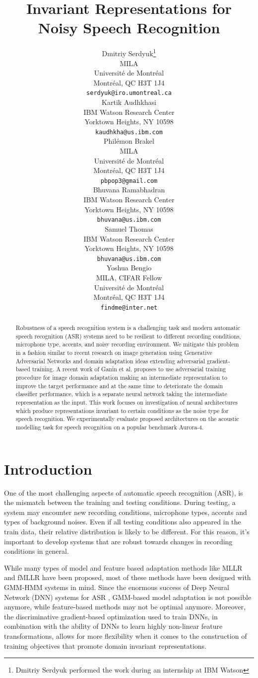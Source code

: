 \documentclass{article}
\title{Invariant Representations for Noisy Speech Recognition}
\author{
  Dmitriy Serdyuk\thanks{Dmitriy Serdyuk performed the work 
    during an internship at IBM Watson} \\
  MILA\\
  Universit\'e de Montr\'eal\\
  Montr\'eal, QC H3T 1J4 \\
  \texttt{serdyuk@iro.umontreal.ca} \\
  \And
  Kartik Audhkhasi \\
  IBM Watson Research Center \\
  Yorktown Heights, NY 10598\\
  \texttt{kaudhkha@us.ibm.com} \\
  \And
  Phil\'emon Brakel \\
  MILA\\
  Universit\'e de Montr\'eal\\
  Montr\'eal, QC H3T 1J4 \\
  \texttt{pbpop3@gmail.com} \\
  \And
  Bhuvana Ramabhadran\\
  IBM  Watson Research Center\\
  Yorktown Heights, NY 10598\\
  \texttt{bhuvana@us.ibm.com} \\
  \And
  Samuel Thomas\\
  IBM  Watson Research Center\\
  Yorktown Heights, NY 10598\\
  \texttt{bhuvana@us.ibm.com} \\
  \And
  Yoshua Bengio\\
  MILA, CIFAR Fellow\\
  Universit\'e de Montr\'eal\\
  Montr\'eal, QC H3T 1J4 \\
  \texttt{findme@inter.net} \\
}
\begin{document}
%
\maketitle
%
\begin{abstract}
    Robustness of a speech recognition system is a challenging task and modern
    automatic speech recognition (ASR) systems need to be resilient to different recording conditions,
    microphone type, accents, and noisy recording environment. We mitigate
    this problem in a fashion similar to recent research on image generation using
    Generative Adversarial Networks and domain adaptation ideas extending
    adversarial gradient-based training. A recent work of Ganin et al. proposes to
    use adversarial training procedure for image domain adaptation making an intermediate
    representation to improve the target performance and at the same time
    to deteriorate the domain classifier performance, which is a separate neural
    network taking the intermediate representation as the input.
    This work focuses on investigation of neural architectures which produce
    representations invariant to certain conditions as the noise type for speech
    recognition.  We
    experimentally evaluate proposed architectures on the acoustic modelling task
    for speech recognition on a popular benchmark Aurora-4.
\end{abstract}
%
%
\section{Introduction}
\label{sec:intro}
    One of the most challenging aspects of automatic speech recognition (ASR),
    is the mismatch between the training and testing conditions. During
    testing, a system may encounter new recording conditions, microphone types,
    accents and types of background noises. Even if all testing conditions also appeared
    in the train data, their relative distribution is likely to be
    different. For this reason, it's important to develop systems that are
    robust towards changes in recording conditions in general.

    While many types of model and feature based adaptation methods like MLLR and fMLLR
    \cite{leggetter1995maximum} have been proposed, most of these methods have
    been designed with GMM-HMM systems in mind. Since the enormous success of
    Deep Neural Network (DNN) systems for ASR \cite{hinton2012deep}, GMM-based
    model adaptation is not possible anymore, while feature-based methods may
    not be optimal anymore.
    Moreover, the discriminative gradient-based optimization used to train
    DNNs, in combination with the ability of DNNs to learn highly non-linear
    feature transformations, allows for more flexibility when it comes to the
    construction of training objectives that promote domain invariant
    representations.
\end{document}
